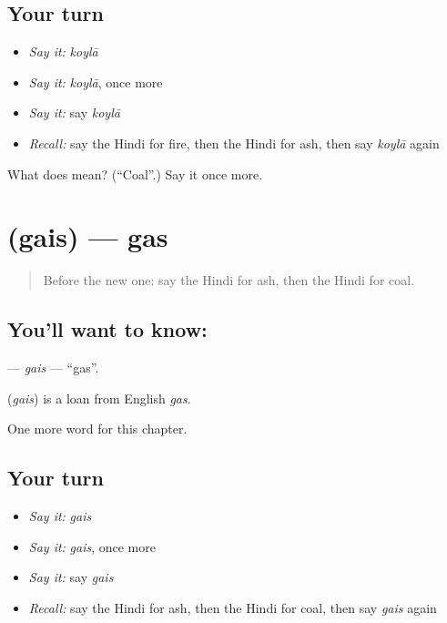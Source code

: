 \subsection*{Your turn}
\begin{itemize}
\raggedright
  \item \emph{Say it:} \emph{koylā}
  \item \emph{Say it:} \emph{koylā}, once more
  \item \emph{Say it:} say \emph{koylā}
  \item \emph{Recall:} say the Hindi for fire, then the Hindi for ash, then say \emph{koylā} again
\end{itemize}

\begin{tcolorbox}[breakable,colback=teal!4,colframe=teal!35!black,title={Before you move on}]
What does  mean? (\textquotedblleft{}Coal\textquotedblright{}.) Say it once more.
\end{tcolorbox}
\section[\texorpdfstring{\hi{गैस} (gais)}{गैस (gais)}]{ (gais) — gas}

\label{lesson:HI-C269-gais}



\begin{quote}
Before the new one: say the Hindi for ash, then the Hindi for coal.
\end{quote}

\subsection*{You'll want to know: }
\textbf{} — \emph{gais} — \textquotedblleft{}gas\textquotedblright{}.

\begin{cousinweb}
\textbf{} (\emph{gais}) is a loan from English \emph{gas}.
\end{cousinweb}

\begin{grammarlens}[title={What you've built}]
One more word for this chapter.
\end{grammarlens}

\subsection*{Your turn}
\begin{itemize}
\raggedright
  \item \emph{Say it:} \emph{gais}
  \item \emph{Say it:} \emph{gais}, once more
  \item \emph{Say it:} say \emph{gais}
  \item \emph{Recall:} say the Hindi for ash, then the Hindi for coal, then say \emph{gais} again
\end{itemize}

